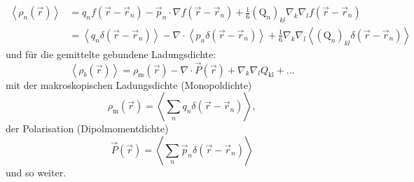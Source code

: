 \begin{align*}
	\left\langle \rho _{n}\left(\vec {r}\right)\right\rangle &=q_{n}f\left(\vec {r}-\vec {r}_{n}\right)-\vec {p}_{n}\cdot \nabla f\left(\vec {r}-\vec {r}_{n}\right)+\frac{1}{6}\left(\mathrm{Q}_{n}\right)_{kl}\nabla _{k}\nabla _{l}f\left(\vec {r}-\vec {r}_{n}\right) \\&=\left\langle q_{n}\delta \left(\vec {r}-\vec {r}_{n}\right)\right\rangle -\nabla \cdot \left\langle p_{n}\delta \left(\vec {r}-\vec {r}_{n}\right)\right\rangle +\frac{1}{6}\nabla _{k}\nabla _{l}\left\langle \left(\mathrm{Q}_{n}\right)_{kl}\delta \left(\vec {r}-\vec {r}_{n}\right)\right\rangle
\end{align*}
und für die gemittelte gebundene Ladungsdichte:
\begin{equation*}
	\left\langle \rho _{b}\left(\vec {r}\right)\right\rangle =\rho _{\mathrm{m}}\left(\vec {r}\right)-\nabla \cdot \vec {P}\left(\vec {r}\right)+\nabla _{k}\nabla _{l}{Q}_{\mathrm{kl}}+\ldots
\end{equation*}
mit der makroskopischen Ladungsdichte (Monopoldichte)
\begin{equation*}
	\rho _{\mathrm{m}}\left(\vec {r}\right)=\left\langle \sum _{n}q_{n}\delta \left(\vec {r}-\vec {r}_{n}\right)\right\rangle ,
\end{equation*}
der Polarisation (Dipolmomentdichte)
\begin{equation*}
	\vec {P}\left(\vec {r}\right)=\left\langle \sum _{n}\vec {p}_{n}\delta \left(\vec {r}-\vec {r}_{n}\right)\right\rangle
\end{equation*}
und so weiter.


